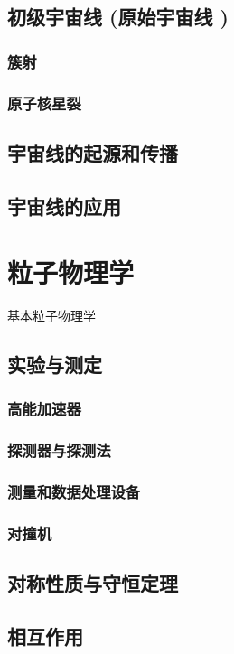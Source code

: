 \documentclass[UTF8]{../06-Physics}
\begin{document}
    \subsection{初级宇宙线 (原始宇宙线 )}
        \subsubsection{簇射}
        \subsubsection{原子核星裂}
    \subsection{宇宙线的起源和传播}
    \subsection{宇宙线的应用}



\section{粒子物理学}
基本粒子物理学
    \subsection{实验与测定}
        \subsubsection{高能加速器}
        \subsubsection{探测器与探测法}
        \subsubsection{测量和数据处理设备}
        \subsubsection{对撞机}
    \subsection{对称性质与守恒定理}
    \subsection{相互作用}
\end{document}

